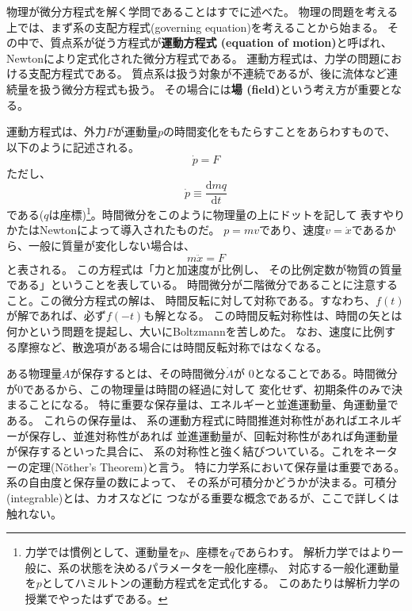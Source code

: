 \documentclass{jarticle}
\newcommand{\diff}{\mathrm d}
\begin{document}
物理が微分方程式を解く学問であることはすでに述べた。
物理の問題を考える上では、まず系の支配方程式(governing equation)を考えることから始まる。
その中で、質点系が従う方程式が{\bf 運動方程式 (equation of motion)}と呼ばれ、
Newtonにより定式化された微分方程式である。
運動方程式は、力学の問題における支配方程式である。
質点系は扱う対象が不連続であるが、後に流体など連続量を扱う微分方程式も扱う。
その場合には{\bf 場 (field)}という考え方が重要となる。

運動方程式は、外力$F$が運動量$p$の時間変化をもたらすことをあらわすもので、
以下のように記述される。
\begin{equation}
  \dot{p} = F
\end{equation}
ただし、
\begin{equation}
  \dot{p} \equiv \frac{\diff mq}{\diff t}
\end{equation}
である($q$は座標)\footnote{
  力学では慣例として、運動量を$p$、座標を$q$であらわす。
  解析力学ではより一般に、系の状態を決めるパラメータを一般化座標$q$、
  対応する一般化運動量を$p$としてハミルトンの運動方程式を定式化する。
  このあたりは解析力学の授業でやったはずである。
}。時間微分をこのように物理量の上にドットを記して
表すやりかたはNewtonによって導入されたものだ。
$p = mv$であり、速度$v = \dot{x}$であるから、一般に質量が変化しない場合は、
\begin{equation}
  m \ddot{x} = F
\end{equation}
と表される。
この方程式は「力と加速度が比例し、
その比例定数が物質の質量である」ということを表している。
時間微分が二階微分であることに注意すること。この微分方程式の解は、
時間反転に対して対称である。すなわち、$f(t)$が解であれば、必ず$f(-t)$も解となる。
この時間反転対称性は、時間の矢とは何かという問題を提起し、大いにBoltzmannを苦しめた。
なお、速度に比例する摩擦など、散逸項がある場合には時間反転対称ではなくなる。

ある物理量$A$が保存するとは、その時間微分$\dot{A}$が
$0$となることである。時間微分が$0$であるから、この物理量は時間の経過に対して
変化せず、初期条件のみで決まることになる。
特に重要な保存量は、エネルギーと並進運動量、角運動量である。
これらの保存量は、
系の運動方程式に時間推進対称性があればエネルギーが保存し、並進対称性があれば
並進運動量が、回転対称性があれば角運動量が保存するといった具合に、
系の対称性と強く結びついている。これをネーターの定理(N\"{o}ther's Theorem)と言う。
特に力学系において保存量は重要である。系の自由度と保存量の数によって、
その系が可積分かどうかが決まる。可積分(integrable)とは、カオスなどに
つながる重要な概念であるが、ここで詳しくは触れない。
\end{document}
